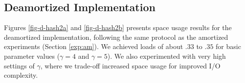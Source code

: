 \documentclass[11pt,letterpaper]{article}
\begin{document}
\begin{table}[!h]
\caption{\label{tab}I/O statistics for our basic (amortized) implementation (a) overall, (b) for operations requiring up to 15 I/Os, and (c) for operations requiring more than 15 I/Os.}
\end{table}


\subsection{Deamortized Implementation}
\label{exp:deam}

Figures \ref{fig-d-hash2a} and \ref{fig-d-hash2b} presents space usage results for the 
deamortized implementation, following the same protocol as the amortized 
experiments (Section \ref{exp:am}).  We achieved loads of about $.33$ to $.35$ 
for basic parameter values ($\gamma=4$ and $\gamma=5$). We also experimented with very
high settings of $\gamma$, where we trade-off increased space usage for improved I/O complexity.
\end{document}
